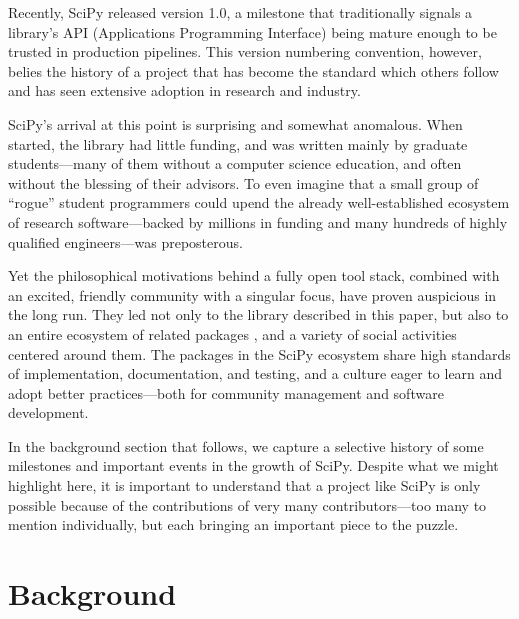 \documentclass[fleqn,10pt]{wlscirep}
\begin{document}
Recently, SciPy released version 1.0, a milestone that traditionally
signals a library's API (Applications Programming Interface) being
mature enough to be trusted in production pipelines. This version
numbering convention, however, belies the history of a project that has
become the standard which others follow and has seen extensive
adoption in research and industry.

SciPy's arrival at this point is surprising and somewhat anomalous.
When started, the library had little funding, and was written mainly
by graduate students---many of them without a computer science education, and often without the
blessing of their advisors.  To even imagine that a small group of
``rogue'' student programmers could upend the already well-established
ecosystem of research software---backed by millions in funding and
many hundreds of highly qualified engineers\cite{mathworks-globe-97,
esri-revenue,bloom-wolfram}---was preposterous.

Yet the philosophical motivations behind a fully open tool stack, combined
with an excited, friendly community with a singular focus, have
proven auspicious in the long run.  They led not only to the library
described in this paper, but also to an entire ecosystem of related
packages \cite{scipy-ecosystem}, and a variety of social activities centered around
them\cite{social-python}. The packages in the SciPy ecosystem
share high standards of implementation,
documentation, and testing, and a culture eager to learn and adopt
better practices---both for community management and software
development.


In the background section that follows, we capture a selective history
of some milestones and important events in the growth of SciPy.
Despite what we might highlight here, it is important to understand
that a project like SciPy is only possible because of the
contributions of very many contributors---too many to mention
individually, but each bringing an important piece to the puzzle.

\section*{Background}
\end{document}

